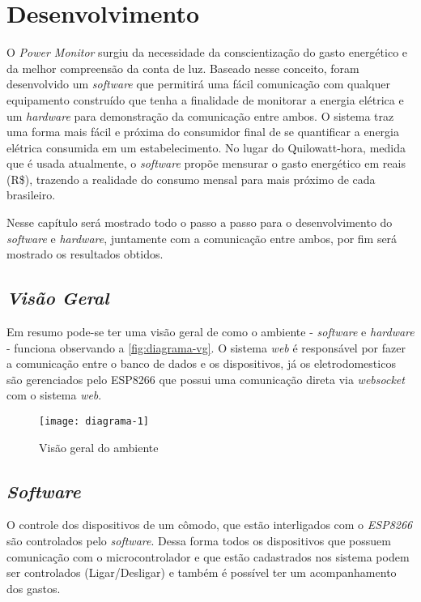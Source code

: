 \chapter[Desenvolvimento]{Desenvolvimento}
\label{ch:desenvolvimento}
O \textit{Power Monitor} surgiu da necessidade da conscientização do gasto energético e da melhor compreensão da conta de luz. Baseado nesse conceito,
foram desenvolvido um \textit{software} que permitirá uma fácil comunicação com qualquer equipamento construído que tenha a finalidade de monitorar a energia elétrica e um \textit{hardware} para demonstração
da comunicação entre ambos. O sistema traz uma forma mais fácil e próxima do consumidor final de se quantificar a energia elétrica consumida em um estabelecimento. No lugar do Quilowatt-hora, medida que é usada atualmente,
o \textit{software} propõe mensurar o gasto energético em reais (R\$), trazendo a realidade do consumo mensal para mais próximo de cada brasileiro.

Nesse capítulo será mostrado todo o passo a passo para o desenvolvimento do \textit{software} e \textit{hardware}, juntamente com a comunicação 
entre ambos, por fim será mostrado os resultados obtidos. 


\section[\textit{Visão Geral}]{\textit{Visão Geral}}\label{visal-geral}

Em resumo pode-se ter uma visão geral de como o ambiente - \textit{software} e \textit{hardware} - funciona observando a \autoref{fig:diagrama-vg}.
O sistema \textit{web} é responsável por fazer a comunicação entre o banco de dados e os dispositivos, já os eletrodomesticos são gerenciados
pelo ESP8266 que possui uma comunicação direta via \textit{websocket} com o sistema \textit{web}.

\begin{figure}[h!]
	\texttt{[image: diagrama-1]}
	\centering
	\caption[Visão geral do ambiente]{Visão geral do ambiente}
	\label{fig:diagrama-vg}
\end{figure}
\FloatBarrier

\section[\textit{Software}]{\textit{Software}}\label{soft-sec}
O controle dos dispositivos de um cômodo, que estão interligados com o \textit{ESP8266} são controlados pelo \textit{software}. Dessa forma
todos os dispositivos que possuem comunicação com o microcontrolador e que estão cadastrados nos sistema podem ser controlados (Ligar/Desligar) e também
é possível ter um acompanhamento dos gastos.

